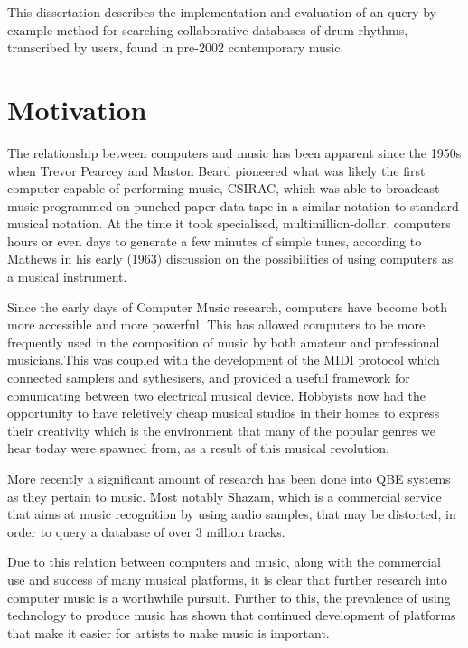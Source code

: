 \documentclass[12pt,twoside,notitlepage]{report}
\begin{document}
	This dissertation describes the implementation and evaluation of an query-by-example method for searching collaborative databases of drum rhythms, transcribed by users, found in pre-2002 contemporary music.
	
	\section{\label{sec:Motivation}Motivation}
	The relationship between computers and music has been apparent since the 1950s when Trevor Pearcey and Maston Beard pioneered what was likely the first computer capable of performing music, CSIRAC\footnotemark {}, which was able to broadcast music programmed on punched-paper data tape in a similar notation to standard musical notation\cite{CSIRAC}. At the time it took specialised, multimillion-dollar, computers hours or even days to generate a few minutes of simple tunes, according to Mathews in his early (1963) discussion on the possibilities of using computers as a musical instrument\cite{Mathews1963}.
	
	Since the early days of Computer Music research, computers have become both more accessible and more powerful. This has allowed computers to be more frequently used in the composition of music by both amateur and professional musicians.This was coupled with the development of the MIDI protocol\footnotemark {} which connected samplers and sythesisers, and provided a useful framework for comunicating between two electrical musical device. Hobbyists now had the opportunity to have reletively cheap musical studios in their homes to express their creativity which is the environment that many of the popular genres we hear today were spawned from, as a result of this musical revolution.
	
	More recently a significant amount of research has been done into QBE\footnotemark {} systems as they pertain to music. Most notably Shazam\cite{Shazam}, which is a commercial service that aims at music recognition by using audio samples, that may be distorted, in order to query a database of over 3 million tracks.
	
	Due to this relation between computers and music, along with the commercial use and success of many musical platforms, it is clear that further research into computer music is a worthwhile pursuit. Further to this, the prevalence of using technology to produce music has shown that continued development of platforms that make it easier for artists to make music is important.
	
\end{document}

